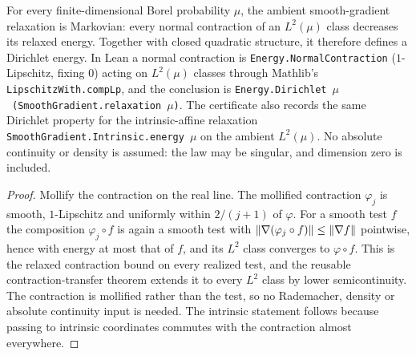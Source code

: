 \begin{theorem}
  \label{thm:smooth-gradient-relaxation-dirichlet}
  \leanok
  For every finite-dimensional Borel probability $\mu$, the ambient smooth-gradient relaxation
  is Markovian: every normal contraction of an $L^2(\mu)$ class decreases its relaxed energy.
  Together with closed quadratic structure, it therefore defines a Dirichlet energy.
  In Lean a normal contraction is \texttt{Energy.NormalContraction} ($1$-Lipschitz, fixing $0$)
  acting on $L^2(\mu)$ classes through Mathlib's \texttt{LipschitzWith.compLp}, and the
  conclusion is \texttt{Energy.Dirichlet}~$\mu$~\texttt{(SmoothGradient.relaxation}~$\mu$\texttt{)}.
  The certificate also records the same Dirichlet property for the intrinsic-affine relaxation
  \texttt{SmoothGradient.Intrinsic.energy}~$\mu$ on the ambient $L^2(\mu)$.  No absolute
  continuity or density is assumed: the law may be singular, and dimension zero is included.
\end{theorem}
\begin{proof}
  \leanok
  Mollify the contraction on the real line.  The mollified contraction $\varphi_j$ is smooth,
  $1$-Lipschitz and uniformly within $2/(j+1)$ of $\varphi$.  For a smooth test $f$ the
  composition $\varphi_j\circ f$ is again a smooth test with $\lVert\nabla(\varphi_j\circ f)\rVert\le
  \lVert\nabla f\rVert$ pointwise, hence with energy at most that of $f$, and its $L^2$ class converges
  to $\varphi\circ f$.  This is the relaxed contraction bound on every realized test, and the
  reusable contraction-transfer theorem extends it to every $L^2$ class by lower semicontinuity.
  The contraction is mollified rather than the test, so no Rademacher, density or absolute
  continuity input is needed.  The intrinsic statement follows because passing to intrinsic
  coordinates commutes with the contraction almost everywhere.
\end{proof}

